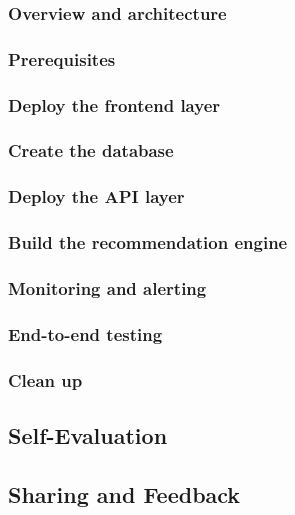 \subsubsection{Overview and architecture}


\subsubsection{Prerequisites}


\subsubsection{Deploy the frontend layer}


\subsubsection{Create the database}


\subsubsection{Deploy the API layer}


\subsubsection{Build the recommendation engine}


\subsubsection{Monitoring and alerting}


\subsubsection{End-to-end testing}


\subsubsection{Clean up}


\newpage

\subsection{Self-Evaluation}



\newpage

\subsection{Sharing and Feedback}



\newpage

